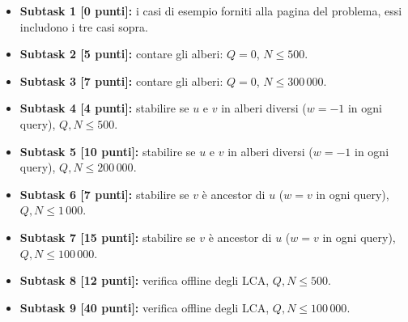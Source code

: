 \documentclass[a4paper,11pt]{article}
\begin{document}
\begin{itemize}
\item \textbf{Subtask 1 [0 punti]:} i casi di esempio forniti alla pagina del problema, essi includono i tre casi sopra.
\item \textbf{Subtask 2 [5 punti]:} contare gli alberi: $Q=0$, $N \le 500$.
\item \textbf{Subtask 3 [7 punti]:} contare gli alberi: $Q=0$, $N \le 300\,000$.
\item \textbf{Subtask 4 [4 punti]:} stabilire se $u$ e $v$ in alberi diversi ($w=-1$ in ogni query), $Q,N \le 500$.
\item \textbf{Subtask 5 [10 punti]:} stabilire se $u$ e $v$ in alberi diversi ($w=-1$ in ogni query), $Q,N \le 200\,000$.
\item \textbf{Subtask 6 [7 punti]:} stabilire se $v$ è ancestor di $u$ ($w=v$ in ogni query), $Q,N \le 1\,000$.
\item \textbf{Subtask 7 [15 punti]:} stabilire se $v$ è ancestor di $u$ ($w=v$ in ogni query), $Q,N \le 100\,000$.
\item \textbf{Subtask 8 [12 punti]:} verifica offline degli LCA, $Q,N \le 500$.
\item \textbf{Subtask 9 [40 punti]:} verifica offline degli LCA, $Q,N \le 100\,000$.
\end{itemize}
\end{document}

